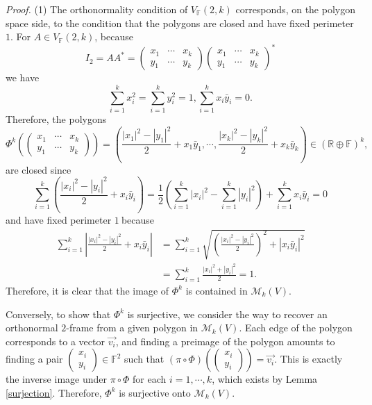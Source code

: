 \documentclass[10pt,a4paper]{amsart}
\newenvironment{proof}[1][Proof]{\noindent\textit{#1.} }{}
\begin{document}
\begin{proof}
(1) The orthonormality condition of $V_{\mathbb{F}}(2,k)$ corresponds, on the
polygon space side, to the condition that the polygons are closed and have
fixed perimeter $1$. For $A\in V_{\mathbb{F}}(2,k)$, because
\[
I_{2}=AA^{\ast}=%
\begin{pmatrix}
x_{1} & \cdots & x_{k}\\
y_{1} & \cdots & y_{k}%
\end{pmatrix}%
\begin{pmatrix}
x_{1} & \cdots & x_{k}\\
y_{1} & \cdots & y_{k}%
\end{pmatrix}
^{\ast}%
\]
we have
\[
\sum_{i=1}^{k}x_{i}^{2}=\sum_{i=1}^{k}y_{i}^{2}=1,\sum_{i=1}^{k}x_{i}\bar
{y}_{i}=0\text{.}%
\]
Therefore, the polygons%
\[
\Phi^{k}\left(
\begin{pmatrix}
x_{1} & \cdots & x_{k}\\
y_{1} & \cdots & y_{k}%
\end{pmatrix}
\right)  =\left(  \frac{\left\vert x_{1}\right\vert ^{2}-\left\vert
y_{1}\right\vert ^{2}}{2}+x_{1}\bar{y}_{1},\cdots,\frac{\left\vert
x_{k}\right\vert ^{2}-\left\vert y_{k}\right\vert ^{2}}{2}+x_{k}\bar{y}%
_{k}\right)  \in\left(  \mathbb{R}\oplus\mathbb{F}\right)  ^{k}\text{,}%
\]
are closed since
\[
\sum_{i=1}^{k}\left(  \frac{\left\vert x_{i}\right\vert ^{2}-\left\vert
y_{i}\right\vert ^{2}}{2}+x_{i}\bar{y}_{i}\right)  =\frac{1}{2}\left(
\sum_{i=1}^{k}\left\vert x_{i}\right\vert ^{2}-\sum_{i=1}^{k}\left\vert
y_{i}\right\vert ^{2}\right)  +\sum_{i=1}^{k}x_{i}\bar{y}_{i}=0
\]
and have fixed perimeter $1\ $because%
\begin{align*}
\sum_{i=1}^{k}\left\vert \frac{\left\vert x_{i}\right\vert ^{2}-\left\vert
y_{i}\right\vert ^{2}}{2}+x_{i}\bar{y}_{i}\right\vert  &  =\sum_{i=1}^{k}%
\sqrt{\left(  \frac{\left\vert x_{i}\right\vert ^{2}-\left\vert y_{i}%
\right\vert ^{2}}{2}\right)  ^{2}+\left\vert x_{i}\bar{y}_{i}\right\vert ^{2}%
}\\
&  =\sum_{i=1}^{k}\frac{\left\vert x_{i}\right\vert ^{2}+\left\vert
y_{i}\right\vert ^{2}}{2}=1\text{.}%
\end{align*}
Therefore, it is clear that the image of $\Phi^{k}$ is contained in
$\mathcal{M}_{k}(V)$.

Conversely, to show that $\Phi^{k}$ is surjective, we consider the way to
recover an orthonormal $2$-frame from a given polygon in $\mathcal{M}_{k}(V)$.
Each edge of the polygon corresponds to a vector $\vec{v_{i}}$, and finding a
preimage of the polygon amounts to finding a pair $%
\begin{pmatrix}
x_{i}\\
y_{i}%
\end{pmatrix}
\in\mathbb{F}^{2}$ such that $(\pi\circ\Phi)\left(
\begin{pmatrix}
x_{i}\\
y_{i}%
\end{pmatrix}
\right)  =\vec{v_{i}}$. This is exactly the inverse image under $\pi\circ\Phi$
for each $i=1,\cdots,k$, which exists by Lemma \ref{surjection}. Therefore,
$\Phi^{k}$ is surjective onto $\mathcal{M}_{k}(V)$.


\end{proof}
\end{document}
